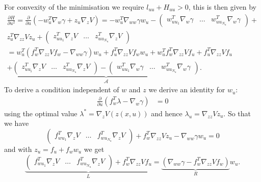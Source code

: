 %
For convexity of the minimisation we require $l_{uu}+H_{uu}>0$, this is then given by
%
\begin{equation}\begin{split}
	\frac{\partial H}{\partial u^2} = \frac{\partial}{\partial u} \left(- w_u^T\nabla_w\gamma + z_u \nabla_z V\right)
	= -w_u^T \nabla_{ww}\gamma w_u - \left(\begin{array}{ccc}
	w_{u{u_1}}^T\nabla_w\gamma & \dots & w_{u{u_{N_u}}}^T\nabla_w\gamma
	\end{array}\right)+\\ z_u^T\nabla_{zz} V z_u + \left(\begin{array}{ccc}
	z_{uu_1}^T\nabla_z V & \dots & z_{uu_{N_u}}^T\nabla_z V
	\end{array}\right)\\
	=w_u^T\left(f_w^T\nabla_{zz}Vf_w-\nabla_{ww}\gamma\right)w_u + f_u^T\nabla_{zz}Vf_w w_u + w_u^Tf_w^T\nabla_{zz}V f_u
	+ f_u^T\nabla_{zz}Vf_u\\
	+\underbrace{\left(\begin{array}{ccc}z_{uu_i}^T\nabla_z V &\dots & z_{uu_{N_u}}^T \nabla_z V
	\end{array}\right)-\left(\begin{array}{ccc}
	w_{uu_1}^T\nabla_w \gamma & \dots & w_{uu_{N_u}}^T\nabla_w \gamma
	\end{array}\right)}_{\mathscr A}.
\end{split}\end{equation}
%
To derive a condition independent of $w$ and $z$ we derive an identity for $w_u$:
%
\begin{equation}\begin{split}
	\frac{\partial}{\partial u} (f_w^T\lambda-\nabla_w\gamma) &= 0
\end{split}\end{equation}
%
using the optimal value $\lambda^\ast=\nabla_z V(z(x,u))$ and hence $\lambda_u = \nabla_{zz}V z_u$.
%
So that we have
%
\begin{equation}
	\left(\begin{array}{ccc} f_{wu_1}^T \nabla_z V & \dots & f_{wu_{N_u}}^T\nabla_z V \end{array}\right) + f_w^T\nabla_{zz}V z_u
	-\nabla_{ww}\gamma w_u=0
\end{equation}
%
and with $z_u = f_u + f_w w_u$ we get
%
\begin{equation}
	\underbrace{\left(\begin{array}{ccc} f_{wu_1}^T \nabla_z V & \dots & f_{wu_{N_u}}^T\nabla_z V \end{array}\right) + f_w^T\nabla_{zz}V f_u}_L =
	\underbrace{(\nabla_{ww}\gamma-f_w^T\nabla_{zz}V f_w)}_R w_u.
\end{equation}
